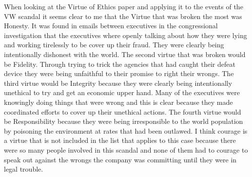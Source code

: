 \documentclass[11pt]{article}
\begin{document}
  When looking at the Virtue of Ethics paper and applying it to the events of the VW scandal it seems clear to me that the Virtue that was broken the most was
  Honesty. It was found in emails between executives in the congressional investigation that the executives where openly talking about how they were lying
  and working tirelessly to be cover up their fraud. They were clearly being intentionally dishonest with the world. The second virtue that was broken would be
  Fidelity. Through trying to trick the agencies that had caught their defeat device they were being unfaithful to their promise to right their wrongs. The third
  virtue would be Integrity because they were clearly being intentionally unethical to try and get an economic upper hand. Many of the executives were knowingly
  doing things that were wrong and this is clear because they made coordinated efforts to cover up their unethical actions. The fourth virtue would be Responsibility
  because they were being irresponsible to the world population by poisoning the environment at rates that had been outlawed. I think courage is a virtue
  that is not included in the list that applies to this case because there were so many people involved in this scandal and none of them had to courage
  to speak out against the wrongs the company was committing until they were in legal trouble.
\end{document}
